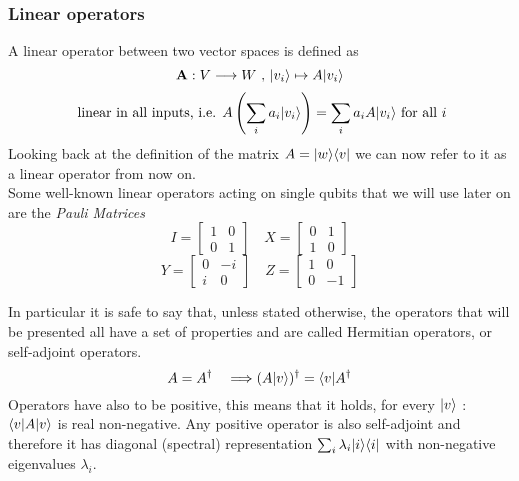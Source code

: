 	\subsubsection*{Linear operators}
	A linear operator between two vector spaces is defined as 
	$$ \mathbf{A}: V\longrightarrow W \text{  ,  }|v_i \rangle\mapsto A|v_i \rangle$$
	$$ \text{ linear in all inputs, i.e.  }  A\left( \sum_i a_i|v_i \rangle\right) = \sum_i a_i A|v_i \rangle \text{  for all } i $$ 
	Looking back at the definition of the matrix $ A = |w \rangle\langle v|$ we can now refer to it as a linear operator from now on. \\
	Some well-known linear operators acting on single qubits that we will use later on are the \textit{Pauli Matrices}
	$$ I = \begin{bmatrix} 1 & 0 \\ 0 & 1 \end{bmatrix}	 \quad   X = \begin{bmatrix} 0 & 1 \\ 1 & 0 \end{bmatrix}$$
	$$ Y= \begin{bmatrix} 0 & -i \\ i & 0 \end{bmatrix}	 \quad   Z = \begin{bmatrix} 1 & 0 \\ 0 & -1 \end{bmatrix}$$
	
	In particular it is safe to say that, unless stated otherwise, the operators that will be presented all have a set of properties and are called Hermitian operators, or self-adjoint operators.\\
	$$ A = A^{\dagger} \quad \Longrightarrow (A|v \rangle)^{\dagger} = \langle v|A^{\dagger} $$ 
	Operators have also to be positive, this means that it holds, for every $|v \rangle$ : $\langle v|A|v \rangle$ is real non-negative. Any positive operator is also self-adjoint and therefore it has diagonal (spectral) representation $\sum_i \lambda_i |i\rangle\langle i|$ with non-negative eigenvalues $\lambda_i$.\\
	

